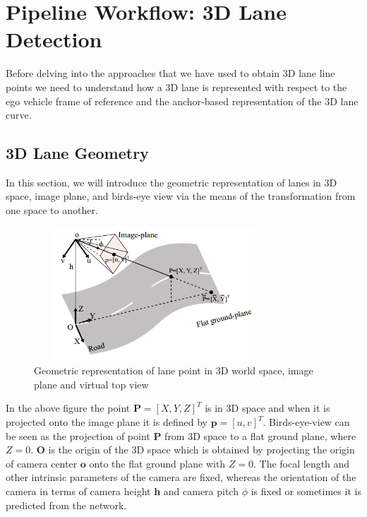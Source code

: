         
        \section{Pipeline Workflow: 3D Lane Detection }
        Before delving into the approaches that we have used to obtain 3D lane line points we need to understand how a 3D lane is represented with respect to the ego vehicle frame of reference and the anchor-based representation of the 3D lane curve.  
        
        \subsection{3D Lane Geometry}
        In this section, we will introduce the geometric representation of lanes in 3D space, image plane, and birds-eye view via the means of the transformation from one space to another. 
        
         \begin{figure}[h]
    \centering
    \includegraphics[width=9cm, height=5cm]{images/3d_lane_geometry.png}
    \caption{Geometric representation of lane point in 3D world space, image plane and virtual top view \cite{DBLP:journals/corr/abs-2112-15351}}
    \end{figure}
    
    In the above figure the point $\textbf{P} =[X, Y, Z]^{T}$ is in 3D space and when it is projected onto the image plane it is defined by $\textbf{p} = [u, v]^{T}$. Birds-eye-view can be seen as the projection of point $\textbf{P}$ from 3D space to a flat ground plane, where $Z=0$. $\textbf{O}$ is the origin of the 3D space which is obtained by projecting the origin of camera center $\textbf{o}$ onto the flat ground plane with $Z = 0$. The focal length and other intrinsic parameters of the camera are fixed, whereas the orientation of the camera in terms of camera height \textbf{h}  and camera pitch \textbf{$\phi$} is fixed or sometimes it is predicted from the network. 
    
